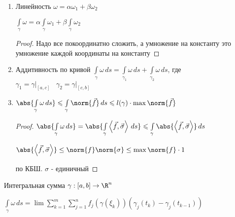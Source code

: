 \begin{properties}
\begin{enumerate}[1.]
\begin{proof}
			$= \int\limits_a^b \left\langle \vec{f}(\gamma(t)), \vec{\sigma}(\gamma(t)) \right\rangle \norm{\gamma'(t)}\,dt = \int\limits_{\gamma} \left\langle \vec{f}, \vec{\sigma} \right\rangle\,ds$
			
			$\vec{\sigma}(\gamma(t)) = \frac{\gamma'(t)}{\norm{\gamma'(t)}}$ (нам нужна касательная к кривой $\Rightarrow$ это производная, а затем надо его отнормировать)
		\end{proof}
		
		\item 
		Линейность $\omega = \alpha \omega_1 + \beta \omega_2$

		$\int\limits_\gamma \omega = \alpha\int\limits_\gamma \omega_1 + \beta\int\limits_\gamma \omega_2$
		\begin{proof}
			Надо все покоординатно сложить, а умножение на константу это умножение каждой координаты на константу
		\end{proof}
		
		\item
		Аддитивность по кривой $ \int\limits_{\gamma} \omega\,ds = \int\limits_{\gamma_1} \omega\,ds + \int\limits_{\gamma_2} \omega\,ds$, где $\gamma_1 = \gamma\Big|_{[a, c]}\;\;\;\gamma_2 = \gamma\Big|_{[c, b]}$
		
		\item
		$\abs{\int\limits_{\gamma} \omega\,ds} \leqslant \int\limits_{\gamma}\norm{\vec{f}}\,ds \leqslant l(\gamma) \cdot \max\norm{\vec{f}}$
		
		\begin{proof}\thmslashn
			
			$\abs{\int\limits_{\gamma} \omega\,ds} = \abs{\int\limits_{\gamma} \left\langle \vec{f}, \vec{\sigma} \right\rangle\,ds} \leqslant  \int\limits_{\gamma} \abs{\left\langle \vec{f}, \vec{\sigma} \right\rangle}\,ds$

            $\abs{\left\langle \vec{f}, \vec{\sigma} \right\rangle} \le \norm{f} \norm{\sigma} \le \max \norm{f} \cdot 1$

            по КБШ. $\sigma$ - единичный
			
		\end{proof}
		
	\end{enumerate}
	
\end{properties}

\begin{exerc}\thmslashn
	
	Интегральная сумма $\gamma:[a, b] \to \R^n$
	
	$\int\limits_{\gamma} \omega\,ds = \lim \sum\limits_{k=1}^m\sum\limits_{j=1}^n f_j(\gamma(\xi_k))(\gamma_j(t_k) - \gamma_j(t_{k-1}))$
	
\end{exerc}
